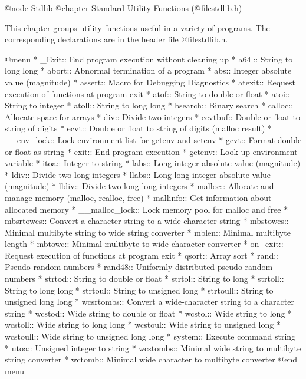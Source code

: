 @node Stdlib
@chapter Standard Utility Functions (@file{stdlib.h})

This chapter groups utility functions useful in a variety of programs.
The corresponding declarations are in the header file @file{stdlib.h}.

@menu 
* _Exit::       End program execution without cleaning up
* a64l::        String to long long
* abort::       Abnormal termination of a program
* abs::         Integer absolute value (magnitude)
* assert::      Macro for Debugging Diagnostics
* atexit::      Request execution of functions at program exit
* atof::        String to double or float
* atoi::        String to integer
* atoll::       String to long long
* bsearch::	Binary search
* calloc::      Allocate space for arrays
* div::         Divide two integers
* ecvtbuf::     Double or float to string of digits
* ecvt::        Double or float to string of digits (malloc result)
* __env_lock::		Lock environment list for getenv and setenv
* gcvt::        Format double or float as string
* exit::        End program execution
* getenv::      Look up environment variable
* itoa::        Integer to string
* labs::        Long integer absolute value (magnitude)
* ldiv::        Divide two long integers
* llabs::       Long long integer absolute value (magnitude)
* lldiv::       Divide two long long integers
* malloc::      Allocate and manage memory (malloc, realloc, free)
* mallinfo::	Get information about allocated memory
* __malloc_lock::	Lock memory pool for malloc and free
* mbsrtowcs::	Convert a character string to a wide-character string
* mbstowcs::	Minimal multibyte string to wide string converter
* mblen::	Minimal multibyte length
* mbtowc::      Minimal multibyte to wide character converter
* on_exit::     Request execution of functions at program exit
* qsort::	Array sort
* rand::        Pseudo-random numbers
* rand48::      Uniformly distributed pseudo-random numbers
* strtod::      String to double or float
* strtol::      String to long
* strtoll::     String to long long
* strtoul::     String to unsigned long
* strtoull::    String to unsigned long long
* wcsrtombs::	Convert a wide-character string to a character string
* wcstod::      Wide string to double or float
* wcstol::      Wide string to long
* wcstoll::     Wide string to long long
* wcstoul::     Wide string to unsigned long
* wcstoull::    Wide string to unsigned long long
* system::      Execute command string
* utoa::        Unsigned integer to string
* wcstombs::	Minimal wide string to multibyte string converter
* wctomb::      Minimal wide character to multibyte converter
@end menu


